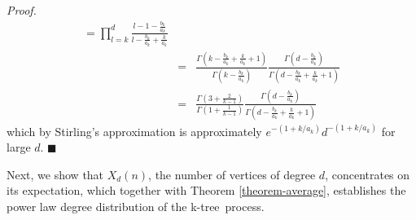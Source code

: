 \documentclass[11pt]{article}
\newenvironment{proof}[0]{\textit{Proof.} }{\hfill  $\blacksquare$ }
\providecommand{\tdeg}[2]{X_{#1}(#2)}
\providecommand{\ktree}{k-tree}
\begin{document}
\begin{proof}
\begin{eqnarray}
  = \prod\limits_{l = k}^{d}\frac{l - 1 - \frac{b_k}{a_k}}{l - \frac{b_k}{a_k} + \frac{k}{a_k}} \nonumber \\
  &=&\frac{\Gamma(k - \frac{b_k}{a_k} + \frac{k}{a_k} + 1)}{\Gamma(k - \frac{b_k}{a_k})} \frac{\Gamma(d - \frac{b_k}{a_k})}{\Gamma(d - \frac{b_k}{a_k} + \frac{k}{a_k} + 1)} \nonumber \\
  &=&\frac{\Gamma(3 + \frac{2}{k - 1})}{\Gamma(1 + \frac{1}{k - 1})} \frac{\Gamma(d - \frac{b_k}{a_k})}{\Gamma(d - \frac{b_k}{a_k} + \frac{k}{a_k} + 1)}
\end{eqnarray}
which by Stirling's approximation is
approximately  $e^{-(1 + k / a_k )}d^{-(1 + k / a_k )}$ for large $d$.
\end{proof}


Next, we show that $\tdeg{d}{n}$, the number of vertices of degree $d$, concentrates on its expectation,  which together with
Theorem \ref{theorem-average}, establishes the power law degree distribution of the \ktree\ process.
\end{document}
